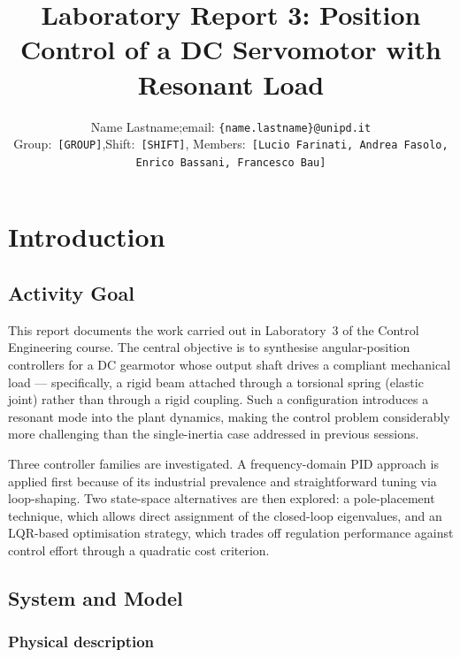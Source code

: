 \documentclass[11pt]{article}
\title{
    {\Large Laboratory Report 3: Position Control of a DC Servomotor with Resonant Load}
}
\author{
    Name Lastname;\quad email: \texttt{\{name.lastname\}@unipd.it}\\[2pt]
    Group:~\texttt{[GROUP]},\quad Shift:~\texttt{[SHIFT]},\quad
    Members:~\texttt{[Lucio Farinati, Andrea Fasolo, Enrico Bassani, Francesco Bau]}
}
\begin{document}
\maketitle
\pagestyle{fancy}
\setcounter{page}{1}
\onehalfspacing


\section{Introduction}

\subsection{Activity Goal}

This report documents the work carried out in Laboratory~3 of the Control Engineering course.
The central objective is to synthesise angular-position controllers for a DC gearmotor whose
output shaft drives a compliant mechanical load — specifically, a rigid beam attached through
a torsional spring (elastic joint) rather than through a rigid coupling.
Such a configuration introduces a resonant mode into the plant dynamics, making the
control problem considerably more challenging than the single-inertia case addressed in
previous sessions.

Three controller families are investigated. A frequency-domain PID approach is applied first
because of its industrial prevalence and straightforward tuning via loop-shaping. Two
state-space alternatives are then explored: a pole-placement technique, which allows direct
assignment of the closed-loop eigenvalues, and an LQR-based optimisation strategy, which
trades off regulation performance against control effort through a quadratic cost criterion.

\subsection{System and Model}

\subsubsection*{Physical description}

\end{document}
